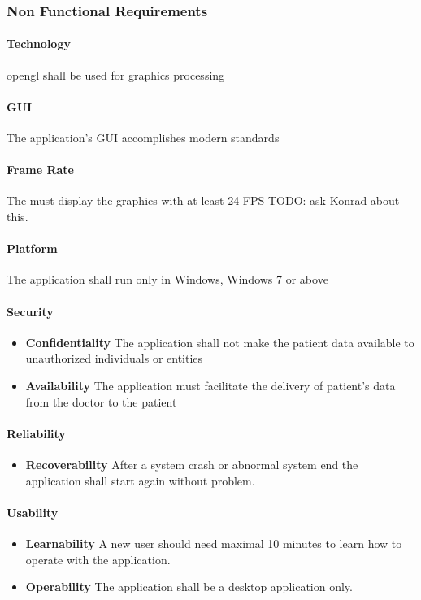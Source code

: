 \newpage

\subsubsection{Non Functional Requirements}
\paragraph{Technology} \gls{opengl} shall be used for graphics processing
\paragraph{GUI} The application's GUI accomplishes modern standards                             
\paragraph{Frame Rate} The must display the graphics with at least 24 FPS TODO: ask Konrad about this. 
\paragraph{Platform} The application shall run only in Windows, Windows 7 or above
\paragraph{Security}
\begin{itemize}
	\item \textbf{Confidentiality} The application shall not make the patient data available to unauthorized individuals or entities 
	\item \textbf{Availability} The application must facilitate the delivery of patient's data from the doctor to the patient
\end{itemize}
\paragraph{Reliability}
\begin{itemize}
	\item \textbf{Recoverability} After a system crash or abnormal system end the application shall start again without problem. 
\end{itemize}
\paragraph{Usability}
\begin{itemize}
	\item \textbf{Learnability}  A new user should need maximal 10 minutes to learn how to operate with the application.
	\item \textbf{Operability} The application shall be a desktop application only.
\end{itemize}
